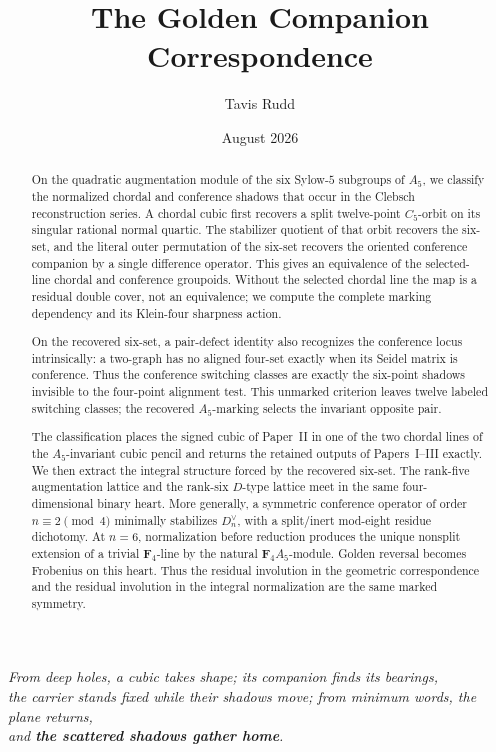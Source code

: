 \documentclass[11pt]{article}
\title{The Golden Companion Correspondence}
\author{Tavis Rudd}
\date{August 2026}
\theoremstyle{definition}
\theoremstyle{remark}
\newcommand{\F}{\mathbf F}
\begin{document}
\begingroup
\makeatletter
\let\clebschmaintitle\@title
\def\@title{\large\textsc{Clebsch: Rigidity from Sparse Shadows --- }\textbf{V}\\[0.7em]
  \LARGE\clebschmaintitle}
\makeatother
\maketitle
\endgroup

\begin{center}
\small\itshape
From deep holes, a cubic takes shape; its companion finds its bearings,\\
the carrier stands fixed while their shadows move; from minimum words, the plane returns,\\
and \textbf{the scattered shadows gather home}.
\end{center}

\begin{abstract}
On the quadratic augmentation module of the six Sylow-\(5\) subgroups of
\(A_5\), we classify the normalized chordal and conference shadows that occur
in the Clebsch reconstruction series.  A chordal cubic first recovers a split
twelve-point \(C_5\)-orbit on its singular rational normal quartic.  The
stabilizer quotient of that orbit recovers the six-set, and the literal outer
permutation of the six-set recovers the oriented conference companion by a
single difference operator.  This gives an equivalence of the selected-line
chordal and conference groupoids.  Without the selected chordal line the map
is a residual double cover, not an equivalence; we compute the complete
marking dependency and its Klein-four sharpness action.

On the recovered six-set, a pair-defect identity also recognizes the
conference locus intrinsically: a two-graph has no aligned four-set exactly
when its Seidel matrix is conference.  Thus the conference switching classes
are exactly the six-point shadows invisible to the four-point alignment test.
This unmarked criterion leaves twelve labeled switching classes; the recovered
\(A_5\)-marking selects the invariant opposite pair.

The classification places the signed cubic of Paper~II in one of the two
chordal lines of the \(A_5\)-invariant cubic pencil and returns the retained
outputs of Papers~I--III exactly.  We then extract the integral structure
forced by the recovered six-set.  The rank-five augmentation lattice and the
rank-six \(D\)-type lattice meet in the same four-dimensional binary heart.
More generally, a symmetric conference operator of order
\(n\equiv2\pmod4\) minimally stabilizes \(D_n^\vee\), with a split/inert
mod-eight residue dichotomy.  At \(n=6\), normalization before reduction
produces the unique nonsplit extension of a trivial \(\F_4\)-line by the
natural \(\F_4A_5\)-module.  Golden reversal becomes Frobenius on this heart.
Thus the residual involution in the geometric correspondence and the
residual involution in the integral normalization are the same marked
symmetry.
\end{abstract}
\end{document}
